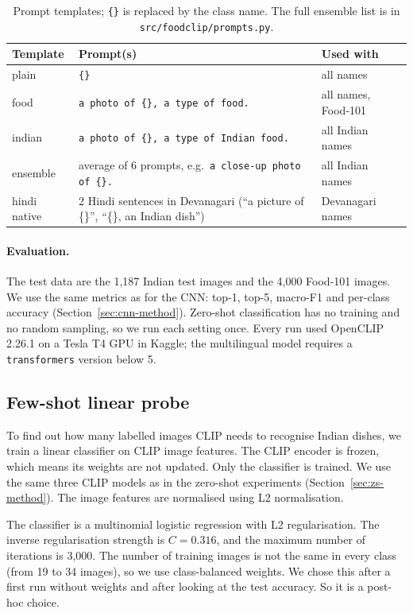 \documentclass[twoside,a4paper,11pt]{article}
\begin{document}
\begin{table}[t]
\centering
\small
\begin{tabular}{lll}
\toprule
Template & Prompt(s) & Used with \\
\midrule
plain & \texttt{\{\}} & all names \\
food & \texttt{a photo of \{\}, a type of food.} & all names, Food-101 \\
indian & \texttt{a photo of \{\}, a type of Indian food.} & all Indian names \\
ensemble & average of 6 prompts, e.g.\ \texttt{a close-up photo of \{\}.} & all Indian names \\
hindi native & 2 Hindi sentences in Devanagari (``a picture of \{\}'', ``\{\}, an Indian dish'') & Devanagari names \\
\bottomrule
\end{tabular}
\caption{Prompt templates; \texttt{\{\}} is replaced by the class name. The full ensemble list is in
\texttt{src/foodclip/prompts.py}.}
\label{tab:templates}
\end{table}

\paragraph{Evaluation.} The test data are the 1{,}187 Indian test images and the 4{,}000 Food-101 images. We use the
same metrics as for the CNN: top-1, top-5, macro-F1 and per-class accuracy (Section~\ref{sec:cnn-method}). Zero-shot
classification has no training and no random sampling, so we run each setting once. Every run used OpenCLIP 2.26.1 on
a Tesla T4 GPU in Kaggle; the multilingual model requires a \texttt{transformers} version below 5.
\subsection{Few-shot linear probe}  %
To find out how many labelled images CLIP needs to recognise Indian dishes, we train a linear classifier on CLIP image features. The CLIP encoder is frozen, which means its weights are not updated. Only the classifier is trained. We use the same three CLIP models as in the zero-shot experiments (Section~\ref{sec:zs-method}). The image features are normalised using L2 normalisation.

The classifier is a multinomial logistic regression with L2 regularisation. The inverse regularisation strength is $C=0.316$, and the maximum number of iterations is 3{,}000. The number of training images is not the same in every class (from 19 to 34 images), so we use class-balanced weights. We chose this after a first run without weights and after looking at the test accuracy. So it is a post-hoc choice.
\end{document}
